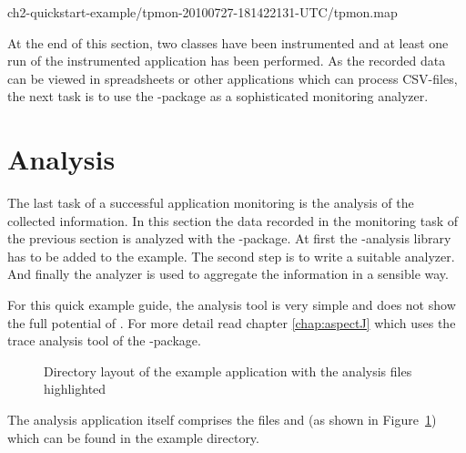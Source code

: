 %
{ch2-quickstart-example/tpmon-20100727-181422131-UTC/tpmon.map}

\noindent At the end of this section, two classes have been instrumented and at least one run of the instrumented application has been performed. As the recorded data can be viewed in spreadsheets or other applications which can process CSV-files, the next task is to use the \KiekerAnalysisPart{}-package as a sophisticated monitoring analyzer. 

\section{Analysis}\label{sec:example:analysis}

The last task of a successful application monitoring is the analysis of the collected information. In this section the data recorded in the monitoring task of the previous section is analyzed with the \KiekerAnalysisPart{}-package. At first the \Kieker{}-analysis library has to be added to the example. The second step is to write a suitable analyzer. And finally the analyzer is used to aggregate the information in a sensible way.

For this quick example guide, the analysis tool is very simple and does not show the full potential of \Kieker{}. For more detail read chapter \ref{chap:aspectJ} which uses the trace analysis tool of the \Kieker{}-package.

\begin{figure}[H]
\begin{graybox}
\end{graybox}
\caption{Directory layout of the example application with the analysis files highlighted}
\label{lst:analysisExampleLayout}
\end{figure}

\noindent The analysis application itself comprises the files  and  (as shown in Figure~\ref{lst:analysisExampleLayout}) which can be found in the example directory. 

